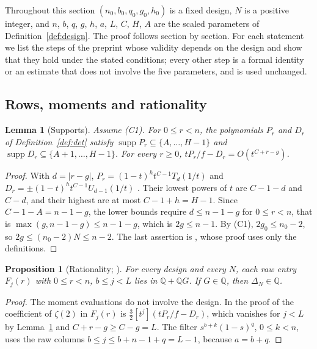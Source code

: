 \documentclass[11pt]{article}
\newtheorem{proposition}[theorem]{Proposition}
\newtheorem{lemma}[theorem]{Lemma}
\theoremstyle{definition}
\begin{document}
Throughout this section $(n_0,b_0,q_0,g_0,h_0)$ is a fixed design, $N$ is a positive integer, and $n$, $b$, $q$, $g$, $h$, $a$, $L$, $C$, $H$, $A$ are the scaled parameters of Definition~\ref{def:design}. The proof follows \cite{OAI} section by section. For each statement we list the steps of the preprint whose validity depends on the design and show that they hold under the stated conditions; every other step is a formal identity or an estimate that does not involve the five parameters, and is used unchanged.

\subsection{Rows, moments and rationality}

\begin{lemma}[Supports]\label{lem:supports}
Assume (C1). For $0\le r<n$, the polynomials $P_r$ and $D_r$ of Definition~\ref{def:det} satisfy $\operatorname{supp}P_r\subseteq\{A,\dots,H-1\}$ and $\operatorname{supp}D_r\subseteq\{A+1,\dots,H-1\}$. For every $r\ge0$, $tP_r/f-D_r=O(t^{C+r-g})$.
\end{lemma}

\begin{proof}
With $d=|r-g|$, $P_r=(1-t)^ht^{C-1}T_d(1/t)$ and $D_r=\pm(1-t)^ht^{C-1}U_{d-1}(1/t)$ \cite[Sec.~2]{OAI}. Their lowest powers of $t$ are $C-1-d$ and $C-d$, and their highest are at most $C-1+h=H-1$. Since $C-1-A=n-1-g$, the lower bounds require $d\le n-1-g$ for $0\le r<n$, that is $\max(g,n-1-g)\le n-1-g$, which is $2g\le n-1$. By (C1), $2g_0\le n_0-2$, so $2g\le(n_0-2)N\le n-2$. The last assertion is \cite[Eq.~(5)]{OAI}, whose proof uses only the definitions.
\end{proof}

\begin{proposition}[Rationality; {\cite[Prop.~2.1]{OAI}}]\label{prop:rational}
For every design and every $N$, each raw entry $F_j(r)$ with $0\le r<n$, $b\le j<L$ lies in $\mathbb Q+\mathbb QG$. If $G\in\mathbb Q$, then $\Delta_N\in\mathbb Q$.
\end{proposition}

\begin{proof}
The moment evaluations \cite[Eqs.~(9)--(19)]{OAI} do not involve the design. In the proof of \cite[Prop.~2.1]{OAI} the coefficient of $\zeta(2)$ in $F_j(r)$ is $\tfrac32[t^j](tP_r/f-D_r)$, which vanishes for $j<L$ by Lemma~\ref{lem:supports} and $C+r-g\ge C-g=L$. The filter $s^{b+k}(1-s)^q$, $0\le k<n$, uses the raw columns $b\le j\le b+n-1+q=L-1$, because $a=b+q$.
\end{proof}
\end{document}
